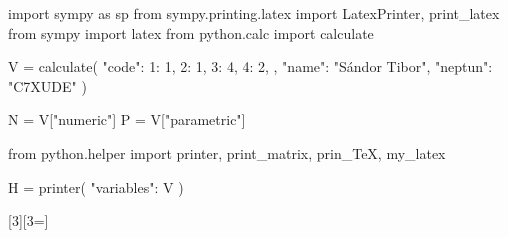 \usepackage[executable=/opt/homebrew/bin/python3]{pyluatex}

\begin{python}
import sympy as sp
from sympy.printing.latex import LatexPrinter, print_latex
from sympy import latex
from python.calc import calculate

V = calculate({
    "code": {
        1: 1, 
        2: 1,
        3: 4,
        4: 2,
    },
    "name": "Sándor Tibor",
    "neptun": "C7XUDE"
})

N = V["numeric"]
P = V["parametric"]

from python.helper import printer, print_matrix, prin_TeX, my_latex

H = printer({
    "variables": V
})
\end{python}

\usepackage{xargs}

\newcommand{\pv}[1]{\py{V["#1"]}}
\newcommand{\pvec}[2]{\py{V["#1"][#2]}}
\newcommand{\pmat}[3]{\py{V["#1"][#2][#3]}}

[3][3=]{}
